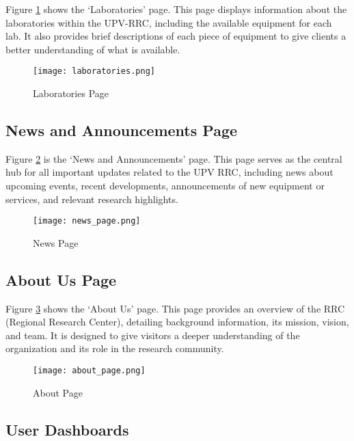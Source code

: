 Figure \ref{fig:laboratories_page} shows the `Laboratories' page. This page displays information about the laboratories within the UPV-RRC, including the available equipment for each lab. It also provides brief descriptions of each piece of equipment to give clients a better understanding of what is available.

\begin{figure}[h]
	\centering
	\texttt{[image: laboratories.png]}
	\caption{Laboratories Page}
	\label{fig:laboratories_page}
\end{figure}

\newpage

\subsection{News and Announcements Page}

Figure \ref{fig:news_page} is the `News and Announcements' page. This page serves as the central hub for all important updates related to the UPV RRC, including news about upcoming events, recent developments, announcements of new equipment or services, and relevant research highlights.

\begin{figure}[h]
	\centering
	\texttt{[image: news\_page.png]}
	\caption{News Page}
	\label{fig:news_page}
\end{figure}

\newpage

\subsection{About Us Page} 

Figure \ref{fig:about_page} shows the `About Us' page. This page provides an overview of the RRC (Regional Research Center), detailing background information, its mission, vision, and team. It is designed to give visitors a deeper understanding of the organization and its role in the research community.

\begin{figure}[h]
	\centering
	\texttt{[image: about\_page.png]}
	\caption{About Page}
	\label{fig:about_page}
\end{figure}

\subsection{User Dashboards}

